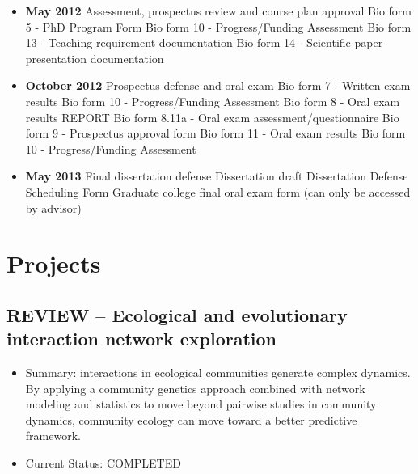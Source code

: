 \documentclass[12pt]{article}
\begin{document}
\begin{itemize}
\item \textbf{May 2012} Assessment, prospectus review and course plan approval
  \subitem Bio form 5 - PhD Program Form
  \subitem Bio form 10 - Progress/Funding Assessment
  \subitem Bio form 13 - Teaching requirement documentation
  \subitem Bio form 14 - Scientific paper presentation documentation
\item \textbf{October 2012} Prospectus defense and oral exam
  \subitem Bio form 7 - Written exam results
  \subitem Bio form 10 - Progress/Funding Assessment
  \subitem Bio form 8 - Oral exam results REPORT
  \subitem Bio form 8.11a - Oral exam assessment/questionnaire
  \subitem Bio form 9 - Prospectus approval form
  \subitem Bio form 11 - Oral exam results
  \subitem Bio form 10 - Progress/Funding Assessment
\item \textbf{May 2013} Final dissertation defense
  \subitem Dissertation draft
  \subitem Dissertation Defense Scheduling Form
  \subitem Graduate college final oral exam form (can only be accessed
  by advisor)
\end{itemize}


\section{Projects}

\subsection{REVIEW -- Ecological and evolutionary interaction network exploration}
\begin{itemize}
\item Summary: interactions in ecological communities generate complex
  dynamics. By applying a community genetics approach combined with
  network modeling and statistics to move beyond pairwise studies in
  community dynamics, community ecology can move toward a better
  predictive framework.
\item Current Status: COMPLETED \cite{lau2010}
\end{itemize}
\end{document}
